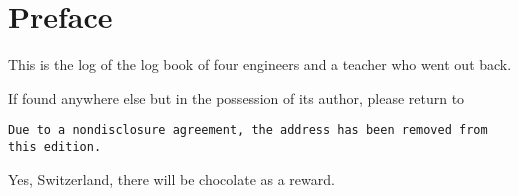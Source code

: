 \chapter{Preface}

This is the log of the log book of four engineers and a teacher who went out back.

\bigskip

If found anywhere else but in the possession of its author, please return to

\smallskip
\texttt{Due to a nondisclosure agreement, the address has been removed from this edition.}
\smallskip

Yes, Switzerland, there will be chocolate as a reward.

